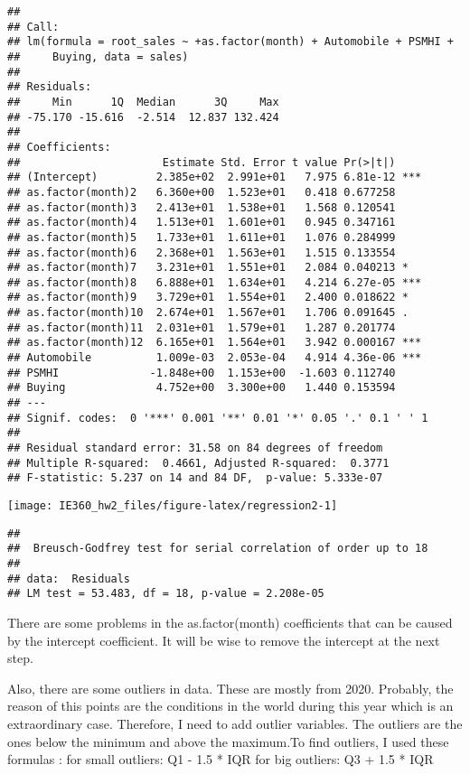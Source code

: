 \documentclass[
]{article}
\begin{document}
\begin{verbatim}
## 
## Call:
## lm(formula = root_sales ~ +as.factor(month) + Automobile + PSMHI + 
##     Buying, data = sales)
## 
## Residuals:
##     Min      1Q  Median      3Q     Max 
## -75.170 -15.616  -2.514  12.837 132.424 
## 
## Coefficients:
##                      Estimate Std. Error t value Pr(>|t|)    
## (Intercept)         2.385e+02  2.991e+01   7.975 6.81e-12 ***
## as.factor(month)2   6.360e+00  1.523e+01   0.418 0.677258    
## as.factor(month)3   2.413e+01  1.538e+01   1.568 0.120541    
## as.factor(month)4   1.513e+01  1.601e+01   0.945 0.347161    
## as.factor(month)5   1.733e+01  1.611e+01   1.076 0.284999    
## as.factor(month)6   2.368e+01  1.563e+01   1.515 0.133554    
## as.factor(month)7   3.231e+01  1.551e+01   2.084 0.040213 *  
## as.factor(month)8   6.888e+01  1.634e+01   4.214 6.27e-05 ***
## as.factor(month)9   3.729e+01  1.554e+01   2.400 0.018622 *  
## as.factor(month)10  2.674e+01  1.567e+01   1.706 0.091645 .  
## as.factor(month)11  2.031e+01  1.579e+01   1.287 0.201774    
## as.factor(month)12  6.165e+01  1.564e+01   3.942 0.000167 ***
## Automobile          1.009e-03  2.053e-04   4.914 4.36e-06 ***
## PSMHI              -1.848e+00  1.153e+00  -1.603 0.112740    
## Buying              4.752e+00  3.300e+00   1.440 0.153594    
## ---
## Signif. codes:  0 '***' 0.001 '**' 0.01 '*' 0.05 '.' 0.1 ' ' 1
## 
## Residual standard error: 31.58 on 84 degrees of freedom
## Multiple R-squared:  0.4661, Adjusted R-squared:  0.3771 
## F-statistic: 5.237 on 14 and 84 DF,  p-value: 5.333e-07
\end{verbatim}

\begin{center}\texttt{[image: IE360\_hw2\_files/figure-latex/regression2-1]} \end{center}

\begin{verbatim}
## 
##  Breusch-Godfrey test for serial correlation of order up to 18
## 
## data:  Residuals
## LM test = 53.483, df = 18, p-value = 2.208e-05
\end{verbatim}

There are some problems in the as.factor(month) coefficients that can be
caused by the intercept coefficient. It will be wise to remove the
intercept at the next step.

Also, there are some outliers in data. These are mostly from 2020.
Probably, the reason of this points are the conditions in the world
during this year which is an extraordinary case. Therefore, I need to
add outlier variables. The outliers are the ones below the minimum and
above the maximum.To find outliers, I used these formulas : for small
outliers: Q1 - 1.5 * IQR for big outliers: Q3 + 1.5 * IQR
\end{document}
